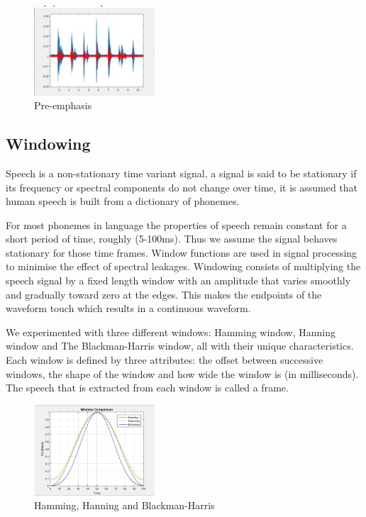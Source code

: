 \documentclass[	DIV=calc,%
							paper=a4,%
							fontsize=9.8pt,%
							twocolumn]{scrartcl}	 					%
\begin{document}
\begin{figure}[ht]
	\centering
	\includegraphics[width=0.4\textwidth]{preemphasis}
	\captionsetup{justification=centering}
	\caption{Pre-emphasis}
\end{figure}

\subsection{Windowing}
Speech is a non-stationary time variant signal, a signal is said to be stationary if its frequency or spectral components do not change over time, it is assumed that human speech is built from a dictionary of phonemes.

\cite{DBLP:journals/taslp/NorholmJC16}
For most phonemes in  language the properties of speech remain constant for a short period of time, roughly (5-100ms). Thus we assume the signal behaves stationary for those time frames. Window functions are used in signal processing to minimise the effect of spectral leakages.
Windowing consists of multiplying the speech signal by a fixed length window with an amplitude that varies smoothly and gradually toward zero at the edges. This makes the endpoints of the waveform touch which results in a continuous waveform. 

We experimented with three different windows: Hamming window, Hanning window and The Blackman-Harris window, all with their unique characteristics. Each window is defined by three attributes:  the offset between successive windows, the shape of the window and how wide the window is (in milliseconds). The speech that is extracted from each window is called a frame. \cite{DBLP:conf/icira/SulistijonoUD16}
\begin{figure}[ht]
	\centering
	\includegraphics[width=0.4\textwidth]{window}
	\captionsetup{justification=centering}
	\caption{Hamming, Hanning and Blackman-Harris}
\end{figure}
\end{document}
